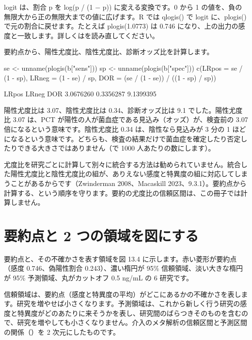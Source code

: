 \begin{KKfbox9ao}[R のメモ]
logit は、割合 p を log(p / (1 − p)) に変える変換です。0 から 1 の値を、負の無限大から正の無限大までの値に広げます。R では qlogis() で logit に、plogis() で元の割合に戻せます。たとえば plogis(1.0773) は 0.746 になり、上の出力の感度と一致します。詳しくはを読み直してください。
\end{KKfbox9ao}

要約点から、陽性尤度比、陰性尤度比、診断オッズ比を計算します。

\begin{rcode}
se <- unname(plogis(b["sens"]))
sp <- unname(plogis(b["spec"]))
c(LRpos = se / (1 - sp), LRneg = (1 - se) / sp,
  DOR = (se / (1 - se)) / ((1 - sp) / sp))
\end{rcode}

\begin{rout}
    LRpos     LRneg       DOR
3.0676260 0.3356287 9.1399395
\end{rout}

陽性尤度比は 3.07、陰性尤度比は 0.34、診断オッズ比は 9.1 でした。陽性尤度比 3.07 は、PCT が陽性の人が菌血症である見込み（オッズ）が、検査前の 3.07 倍になるという意味です。陰性尤度比 0.34 は、陰性なら見込みが 3 分の 1 ほどになるという意味です。どちらも、検査の結果だけで菌血症を確定したり否定したりできる大きさではありません（で 1000 人あたりの数にします）。

尤度比を研究ごとに計算して別々に統合する方法は勧められていません。統合した陽性尤度比と陰性尤度比の組が、ありえない感度と特異度の組に対応してしまうことがあるからです（Zwinderman 2008、Macaskill 2023、9.3.1）。要約点から計算する、という順序を守ります。要約の尤度比の信頼区間は、この冊子では計算しません。

\section{要約点と 2 つの領域を図にする}
\label{sec:13-6}

要約点と、その不確かさを表す領域を図 13.4 に示します。赤い菱形が要約点（感度 0.746、偽陽性割合 0.243）、濃い楕円が 95\% 信頼領域、淡い大きな楕円が 95\% 予測領域、丸がカットオフ 0.5 ng/mL の 6 研究です。


信頼領域は、要約点（感度と特異度の平均）がどこにあるかの不確かさを表します。研究を増やせば小さくなります。予測領域は、これから新しく行う研究の感度と特異度がどのあたりに来そうかを表し、研究間のばらつきそのものを含むので、研究を増やしても小さくなりません。介入のメタ解析の信頼区間と予測区間の関係（）を 2 次元にしたものです。

